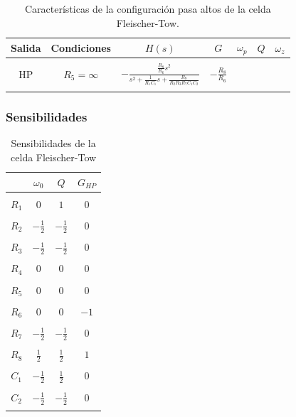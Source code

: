 \begin{table}[H] %
	\centering
	\begin{tabular}{c c c c c c c}
		Salida & Condiciones & $H(s)$ & $G$ & $\omega_p$ & $Q$ & $\omega_z$\\
		\hline \\
		HP & $R_5=\infty$&$- \frac{\frac{R_8}{R_6}s^2}{s^2+\frac{1}{R_1C_1}s+\frac{R_8}{R_2R_3R_7C_1C_2}}$&$-\frac{R_8}{R_6}$\\ \\
		\hline
	\end{tabular}
	\caption{Caracter\'isticas de la configuraci\'on pasa altos de la celda Fleischer-Tow.}
	\label{f_cars}
\end{table}

\subsubsection{Sensibilidades}

\begin{table}[H]
	\centering
	\begin{tabular}{c c c c}
		& $\omega_0$ & $Q$ & $G_{HP}$\\
		\hline \\ 
		$R_1$ & $0$ & $1$ &  $0$ \\ \\
		$R_2$ & $-\frac{1}{2}$ & $-\frac{1}{2}$ &  $0$\\ \\
		$R_3$ & $-\frac{1}{2}$ & $-\frac{1}{2}$ &  $0$\\ \\
		$R_4$ & $0$ & $0$ &  $0$ \\ \\
		$R_5$ & $0$ & $0$ &  $0$ \\ \\
		$R_6$ & $0$ & $0$ &  $-1$\\ \\
		$R_7$ & $-\frac{1}{2}$ & $-\frac{1}{2}$ &  $0$ \\ \\
		$R_8$ & $\frac{1}{2}$ & $\frac{1}{2}$ &  $1$ \\ \\
		$C_1$ & $-\frac{1}{2}$ & $\frac{1}{2}$ &  $0$ \\ \\
		$C_2$ & $-\frac{1}{2}$ & $-\frac{1}{2}$ &  $0$ \\ \\
		\hline
	\end{tabular}
	\caption{Sensibilidades de la celda Fleischer-Tow}
	\label{sens_am}
\end{table}

